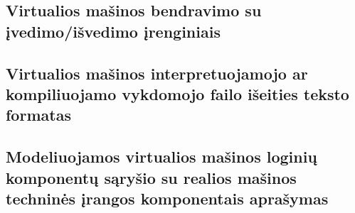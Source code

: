 \subsection{Virtualios mašinos bendravimo su įvedimo/išvedimo įrenginiais}

\subsection{Virtualios mašinos interpretuojamojo ar kompiliuojamo vykdomojo 
failo išeities teksto formatas}

\subsection{Modeliuojamos virtualios mašinos loginių komponentų sąryšio su 
realios mašinos techninės įrangos komponentais aprašymas}
   


